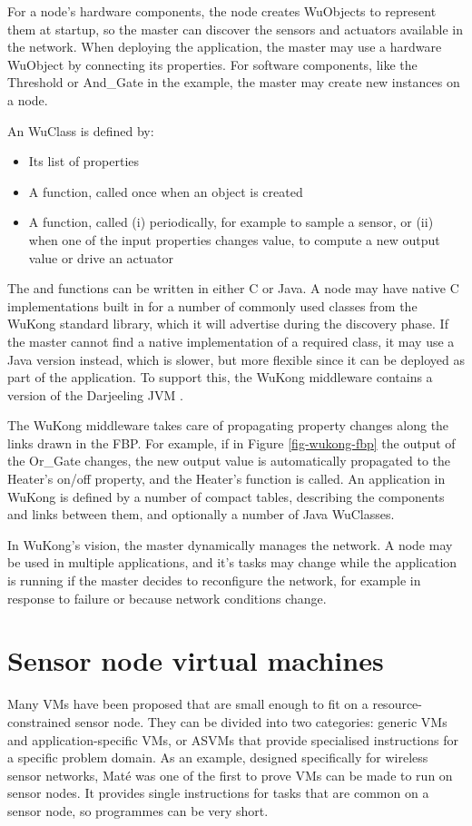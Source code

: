 For a node's hardware components, the node creates WuObjects to represent them at startup, so the master can discover the sensors and actuators available in the network. When deploying the application, the master may use a hardware WuObject by connecting its properties. For software components, like the Threshold or And\_Gate in the example, the master may create new instances on a node.

An WuClass is defined by:
\begin{itemize}
    \item Its list of properties
    \item A  function, called once when an object is created
    \item A  function, called (i) periodically, for example to sample a sensor, or (ii) when one of the input properties changes value, to compute a new output value or drive an actuator
\end{itemize}

The  and  functions can be written in either C or Java. A node may have native C implementations built in for a number of commonly used classes from the WuKong standard library, which it will advertise during the discovery phase. If the master cannot find a native implementation of a required class, it may use a Java version instead, which is slower, but more flexible since it can be deployed as part of the application. To support this, the WuKong middleware contains a version of the Darjeeling JVM \cite{Brouwers:2009cj}.


The WuKong middleware takes care of propagating property changes along the links drawn in the FBP. For example, if in Figure \ref{fig-wukong-fbp} the output of the Or\_Gate changes, the new output value is automatically propagated to the Heater's on/off property, and the Heater's  function is called. An application in WuKong is defined by a number of compact tables, describing the components and links between them, and optionally a number of Java WuClasses.

In WuKong's vision, the master dynamically manages the network. A node may be used in multiple applications, and it's tasks may change while the application is running if the master decides to reconfigure the network, for example in response to failure \cite{Su:2014uf} or because network conditions change.


\section{Sensor node virtual machines}
Many VMs have been proposed that are small enough to fit on a resource-constrained sensor node. They can be divided into two categories: generic VMs and application-specific VMs, or ASVMs \cite{Culler05} that provide specialised instructions for a specific problem domain. As an example, designed specifically for wireless sensor networks, Mat\'e \cite{Levis:2002ku} was one of the first to prove VMs can be made to run on sensor nodes. It provides single instructions for tasks that are common on a sensor node, so programmes can be very short.  

